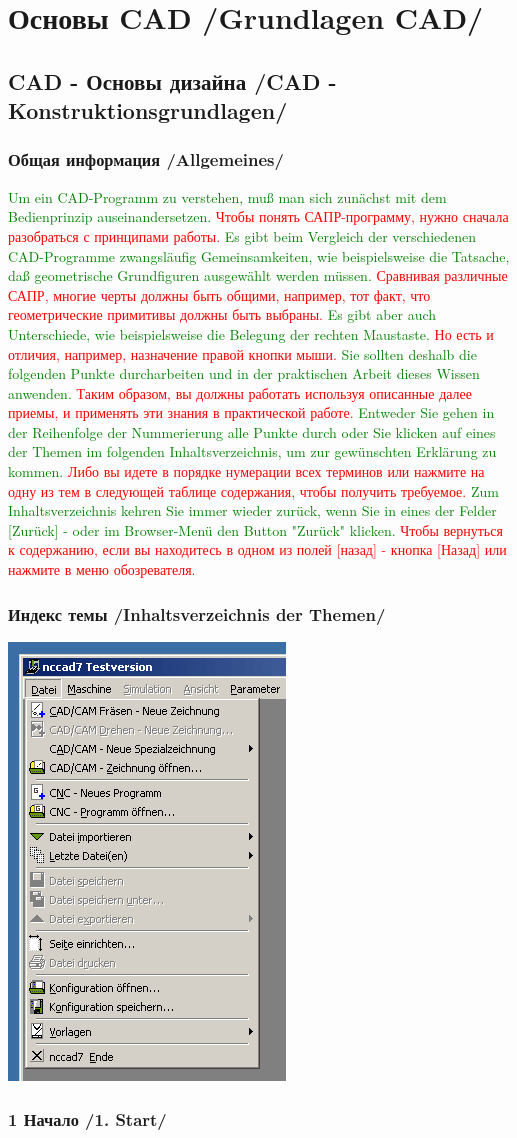 \documentclass[12pt,a4paper]{book}
\newcommand{\keys}[1]{[#1]}
\newcommand{\DE}[1]{\textcolor{green}{#1}}
\newcommand{\RU}[1]{\textcolor{red}{#1}}
\newcommand{\TRchapter}[2]{\chapter{#2 /#1/}}
\newcommand{\TRsection}[2]{\section{#2 /#1/}}
\newcommand{\TRsubsection}[2]{\subsection{#2 /#1/}}
\begin{document}
\TRchapter{Grundlagen CAD}{Основы CAD}
	\TRsection{CAD - Konstruktionsgrundlagen}{CAD - Основы дизайна}

\TRsubsection{Allgemeines}{Общая информация}

\DE{Um ein CAD-Programm zu verstehen, muß man sich zunächst mit dem
Bedienprinzip auseinandersetzen.}
\RU{Чтобы понять САПР-программу, нужно сначала разобраться с принципами работы.}
\DE{Es gibt beim Vergleich der verschiedenen
CAD-Programme zwangsläufig Gemeinsamkeiten, wie beispielsweise die Tatsache, 
daß geometrische 
Grundfiguren ausgewählt werden müssen.}
\RU{Сравнивая различные САПР, многие черты должны быть общими, например, тот
факт, что геометрические примитивы должны быть выбраны.}
\DE{Es gibt aber auch Unterschiede, wie 
beispielsweise die Belegung der rechten Maustaste.}
\RU{Но есть и отличия, например, назначение правой кнопки мыши.}
\DE{Sie sollten deshalb die folgenden Punkte durcharbeiten und in der praktischen 
Arbeit dieses Wissen anwenden.} 
\RU{Таким образом, вы должны работать используя описанные далее приемы, и
применять эти знания в практической работе.}
\DE{Entweder Sie gehen in der Reihenfolge der Nummerierung alle Punkte durch
oder Sie klicken auf eines der Themen im folgenden Inhaltsverzeichnis, um zur 
gewünschten Erklärung zu kommen.}
\RU{Либо вы идете в порядке нумерации всех терминов или нажмите на одну из тем в
следующей таблице содержания, чтобы получить требуемое.}
\DE{Zum Inhaltsverzeichnis kehren Sie immer wieder zurück, wenn Sie in eines der 
Felder [Zurück] - oder im Browser-Menü den Button "Zurück" klicken.}
\RU{Чтобы вернуться к содержанию, если вы находитесь в одном из полей
\keys{назад} - кнопка \keys{Назад} или нажмите в меню обозревателя.}

\TRsubsection{Inhaltsverzeichnis der Themen}{Индекс темы}

\includegraphics{pic/Kons1.png}
\TRsubsection{1. Start}{1 Начало}
\end{document}
